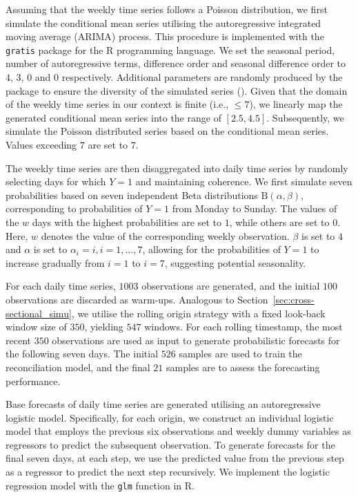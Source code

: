 \documentclass[a4paper,review,12pt,authoryear]{elsarticle}
\let\code=\texttt
\let\proglang=\textsf
\theoremstyle{definition}
\begin{document}
     Assuming that the weekly time series follows a Poisson distribution, we first simulate the conditional mean series utilising the autoregressive integrated moving average (ARIMA) process. This procedure is implemented with the \code{gratis} package \citep{gratis}
     for the \proglang{R} programming language. We set the seasonal period, number of autoregressive terms, difference order and seasonal difference order to $4$, $3$, $0$ and $0$ respectively. 
     Additional parameters are randomly produced by the package to ensure the diversity of the simulated series ().
     Given that the domain of the weekly time series in our context is finite (i.e., $\leq 7$), we linearly map the generated conditional mean series into the range of $[2.5, 4.5]$.
     Subsequently, we simulate the Poisson distributed series based on the conditional mean series. Values exceeding $7$ are set to $7$.

     The weekly time series are then disaggregated into daily time series by randomly selecting days for which $Y=1$ and maintaining coherence.
     We first simulate seven probabilities based on seven independent Beta distributions $\textrm{B}(\alpha, \beta)$, corresponding to probabilities of $Y=1$ from Monday to Sunday.
     The values of the $w$ days with the highest probabilities are set to $1$, while others are set to $0$. Here, $w$ denotes the value of the corresponding weekly observation.
     $\beta$ is set to $4$ and $\alpha$ is set to $\alpha_i = i, i=1,\dots,7$, allowing for the probabilities of $Y=1$ to increase gradually from $i=1$ to $i=7$, suggesting potential seasonality.

     For each daily time series, $1003$ observations are generated, and the initial $100$ observations are discarded as warm-ups. Analogous to Section~\ref{sec:cross-sectional_simu}, we utilise the rolling origin strategy with a fixed look-back window size of $350$, yielding $547$ windows.
     For each rolling timestamp, the most recent $350$ observations are used as input to generate probabilistic forecasts for the following seven days.
     The initial $526$ samples are used to train the reconciliation model, and the final $21$ samples are to assess the forecasting performance.

     Base forecasts of daily time series are generated utilising an autoregressive logistic model.
     Specifically, for each origin, we construct an individual logistic model that employs the previous six observations and weekly dummy variables as regressors to predict the subsequent observation.
     To generate forecasts for the final seven days, at each step, we use the predicted value from the previous step as a regressor to predict the next step recursively.
     We implement the logistic regression model with the \code{glm} function in \proglang{R}.
\end{document}
